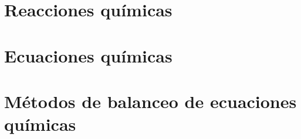 


\section{Reacciones químicas}



\section{Ecuaciones químicas}



\section{Métodos de balanceo de ecuaciones químicas}


